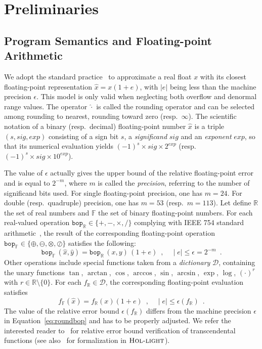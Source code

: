 \documentclass[preprint]{sigplanconf}
\newcommand{\setD}{\mathcal{D}} %
\newcommand{\R}{\mathbb{R}}
\newcommand{\F}{\mathbb{F}}
\newcommand{\hol}{\text{\sc Hol-light}}
\newcommand{\bop}{\mathtt{bop}}
\theoremstyle{plain}
\begin{document}
\section{Preliminaries}
\label{sec:background}

\subsection{Program Semantics and Floating-point Arithmetic}
\label{sec:fpbackground}
We adopt the standard practice~\cite{higham2002accuracy} to approximate a real float $x$ with its closest floating-point representation $\hat{x} = x (1 + e)$, with $|e|$ being less than the machine precision $\epsilon$. This model is only valid when neglecting both overflow and denormal range values.
The operator $\hat{\cdot}$ is called the rounding operator and can be selected among rounding to nearest, rounding toward zero (resp.~$\infty$).
The scientific notation of a binary (resp.~decimal) floating-point number $\hat{x}$ is a triple $(s, sig, exp)$ consisting of a sign bit $s$, a {\em significand} $sig$ and an {\em exponent} $exp$, so that its numerical evaluation yields $(-1)^{s} \times sig \times 2^{exp}$ (resp.~$(-1)^{s} \times sig \times 10^{exp}$). 

The value of $\epsilon$ actually gives the upper bound of the relative floating-point error and is equal to $2^{-m}$, where $m$ is called the {\em precision}, referring to the number of significand bits used. For single floating-point precision, one has $m = 24$. For double (resp.~quadruple) precision, one has $m = 53$ (resp.~$m=113$). Let define $\R$ the set of real numbers and $\F$ the set of binary floating-point numbers.
For each real-valued operation $\bop_\R \in \{+, -, \times, \slash \}$ complying with IEEE 754 standard arithmetic~\cite{IEEE}, the result of the corresponding floating-point operation $\bop_\F \in \{\oplus, \ominus, \otimes, \oslash \}$ satisfies the following:
\begin{equation}
\label{eq:roundbop}
\bop_\F \, (\hat{x}, \hat{y}) = \bop_\R \, (x, y) \, (1 + e) \enspace, \quad \mid e \mid \leq \epsilon = 2^{-m} \enspace.
\end{equation}
%
Other operations include special functions taken from a {\em dictionary} $\setD$, containing the unary functions
$\tan$, $\arctan$, $\cos$, $\arccos$, $\sin$, $\arcsin$, $\exp$, $\log$, $(\cdot)^{r}$ with $r\in \R\setminus\{0\}$. For each $f_\R \in \setD$, the corresponding floating-point evaluation satisfies 
\begin{equation}
\label{eq:roundtransc}
f_\F (\hat{x}) = f_\R (x) (1 + e) \enspace, \quad \mid e \mid \leq \epsilon (f_\R) \enspace.
\end{equation}
The value of the relative error bound $\epsilon (f_\R)$ differs from the machine precision $\epsilon$ in Equation~\eqref{eq:roundbop} and has to be properly adjusted. We refer the interested reader to~\cite{VerifCADTransc} for relative error bound verification of transcendental functions (see also~\cite{VerifHOLTransc} for formalization in $\hol$).
%
\end{document}

